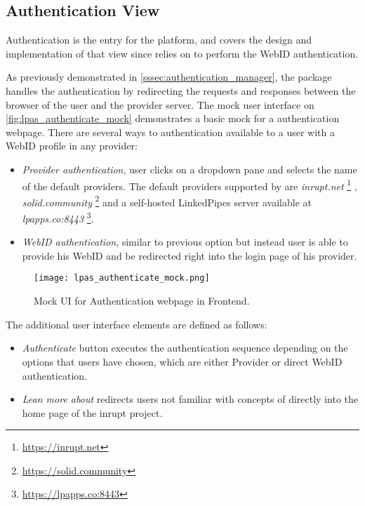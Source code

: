 \subsection{Authentication View}
\label{sssec:architecture_auth_view}

Authentication is the entry for the \lpa{} platform, and \lpas{} covers the design and implementation of that view since \lpa{} relies on \solid{} to perform the WebID authentication. 

As previously demonstrated in \autoref{sssec:authentication_manager}, the \lpas{} package handles the authentication by redirecting the requests and responses between the browser of the user and the \solid{} provider server. The mock user interface on \autoref{fig:lpas_authenticate_mock} demonstrates a basic mock for a authentication webpage. There are several ways to authentication available to a \lpa{} user with a WebID profile in any \solid provider:
\begin{itemize}
    \item \textit{Provider authentication}, user clicks on a dropdown pane and selects the name of the default providers. The default providers supported by \lpas{} are \textit{inrupt.net} \footnote{\url{https://inrupt.net}} , \textit{solid.community} \footnote{\url{https://solid.community}} and a self-hosted LinkedPipes server available at \textit{lpapps.co:8443} \footnote{\url{https://lpapps.co:8443}}.
    \item \textit{WebID authentication}, similar to previous option but instead user is able to provide his WebID and be redirected right into the login page of his provider.
\end{itemize} 

\begin{figure}[h]
\centering
\texttt{[image: lpas\_authenticate\_mock.png]}
\caption{Mock UI for Authentication webpage in \lpa{} Frontend.}
\label{fig:lpas_authenticate_mock}
\end{figure}

The additional user interface elements are defined as follows:

\begin{itemize}
    \item \textit{Authenticate} button executes the authentication sequence depending on the options that users have chosen, which are either Provider or direct WebID authentication.
    \item \textit{Lean more about \solid{}} redirects users not familiar with concepts of \solid{} directly into the home page of the inrupt project.
\end{itemize}
 

